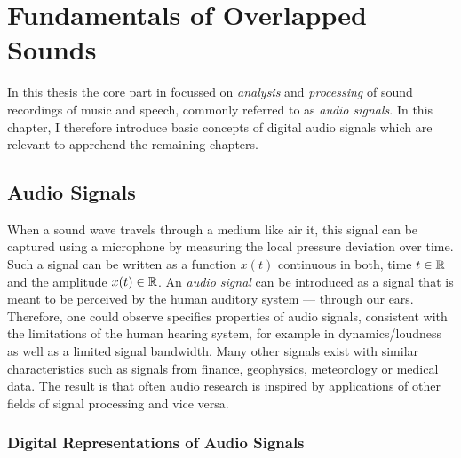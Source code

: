 \hypertarget{Fundamentals of Overlapped Sounds}{%
\chapter{Fundamentals of Overlapped Sounds}\label{cha:fundamentals}}

In this thesis the core part in focussed on \emph{analysis} and \emph{processing} of sound recordings of music and speech, commonly referred to as \emph{audio signals}.
In this chapter, I therefore introduce basic concepts of digital audio signals which are relevant to apprehend the remaining chapters.

\hypertarget{Audio Signals}{%
\section{Audio Signals}\label{sec:specifics-of-audio-signals}}

When a sound wave travels through a medium like air it, this signal can be captured using a microphone by measuring the local pressure deviation over time.
Such a signal can be written as a function \(x(t)\) continuous in both, time \(t \in {\mathbb{R}}\) and the amplitude \(x(t) \in {\mathbb{R}}\).
An \emph{audio signal} can be introduced as a signal that is meant to be perceived by the human auditory system --- through our ears.
Therefore, one could observe specifics properties of audio signals, consistent with the limitations of the human hearing system, for example in dynamics/loudness as well as a limited signal bandwidth.
Many other signals exist with similar characteristics such as signals from finance, geophysics, meteorology or medical data.
The result is that often audio research is inspired by applications of other fields of signal processing and vice versa.

\hypertarget{digital-representations-of-audio-signals}{%
\subsection{Digital Representations of Audio
Signals}\label{digital-representations-of-audio-signals}}

